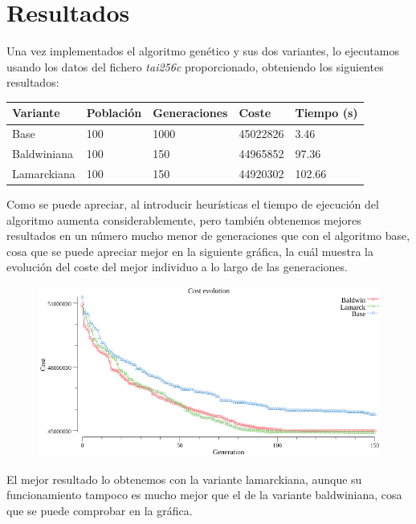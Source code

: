 \section{Resultados}
Una vez implementados el algoritmo genético y sus dos variantes, lo ejecutamos usando los datos del fichero \textit{tai256c} proporcionado, obteniendo los siguientes resultados:

\begin{table}[H]
\centering
\begin{tabular}{|l|l|l|l|l|}
\hline
Variante & Población & Generaciones & Coste & Tiempo (s) \\ \hline
Base & 100 & 1000 & 45022826 & 3.46 \\ \hline
Baldwiniana & 100 & 150 & 44965852 & 97.36 \\ \hline
Lamarckiana & 100 & 150 & 44920302 & 102.66 \\ \hline
\end{tabular}
\end{table}

Como se puede apreciar, al introducir heurísticas el tiempo de ejecución del algoritmo aumenta considerablemente, pero también obtenemos mejores resultados en un número mucho menor de generaciones que con el algoritmo base, cosa que se puede apreciar mejor en la siguiente gráfica, la cuál muestra la evolución del coste del mejor individuo a lo largo de las generaciones.

\begin{figure}[H]
\centering
\includegraphics[width=\textwidth]{images/costEvolution.png}
\end{figure}

El mejor resultado lo obtenemos con la variante lamarckiana, aunque su funcionamiento tampoco es mucho mejor que el de la variante baldwiniana, cosa que se puede comprobar en la gráfica.